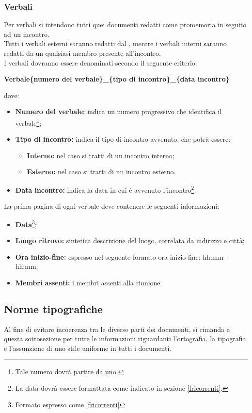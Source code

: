 \subsubsection{Verbali}
\label{verbali}
Per verbali si intendono tutti quei documenti redatti come promemoria in seguito ad un incontro.
\\Tutti i verbali esterni saranno redatti dal \projectManager{}, mentre i verbali interni saranno redatti da un qualsiasi membro presente all'incontro.
\\I verbali dovranno essere denominati secondo il seguente criterio:
\begin{center}
	\textbf{Verbale\{numero del verbale\}\_\{tipo di incontro\}\_\{data incontro\}}
\end{center}
dove:
\begin{itemize}
\item \textbf{Numero del verbale:} indica un numero progressivo che identifica il verbale\footnote{Tale numero dovrà partire da uno.};
\item \textbf{Tipo di incontro:} indica il tipo di incontro avvenuto, che potrà essere:
\begin{itemize}
\item \textbf{Interno:} nel caso si tratti di un incontro interno;
\item \textbf{Esterno:} nel caso si tratti di un incontro esterno.
\end{itemize}
\item \textbf{Data incontro:} indica la data in cui è avvenuto l'incontro\footnote{La data dovrà essere formattata come indicato in sezione \ref{fricorrenti}.}.
\end{itemize}
La prima pagina di ogni verbale deve contenere le seguenti informazioni:
\begin{itemize}
\item \textbf{Data}\footnote{Formato espresso come \ref{fricorrenti}};
\item \textbf{Luogo ritrovo:} sintetica descrizione del luogo, correlata da indirizzo e città;
\item \textbf{Ora inizio-fine:} espresso nel seguente formato ora inizio-fine: hh:mm-hh:mm;
\item \textbf{Membri assenti:} i membri assenti alla riunione.
\end{itemize}

\subsection{Norme tipografiche}
\label{norme tipografiche}
Al fine di evitare incoerenza tra le diverse parti dei documenti, si rimanda a questa sottosezione per tutte le informazioni riguardanti l'ortografia, la tipografia e l'assunzione di uno stile uniforme in tutti i documenti.	

